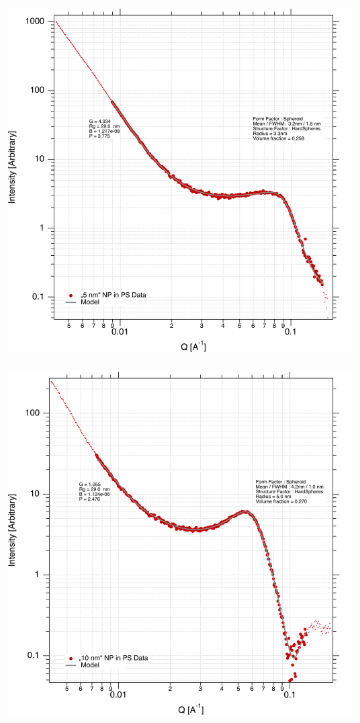 \begin{figure}[tp]
	\centering
	\begin{subfigure}[b]{0.3\textwidth}
		\includegraphics[width=\linewidth]{images/ps5.pdf}
	\end{subfigure}
	\begin{subfigure}[b]{0.3\textwidth}
		\includegraphics[width=\linewidth]{images/ps10.pdf}

\end{subfigure}
\end{figure}

